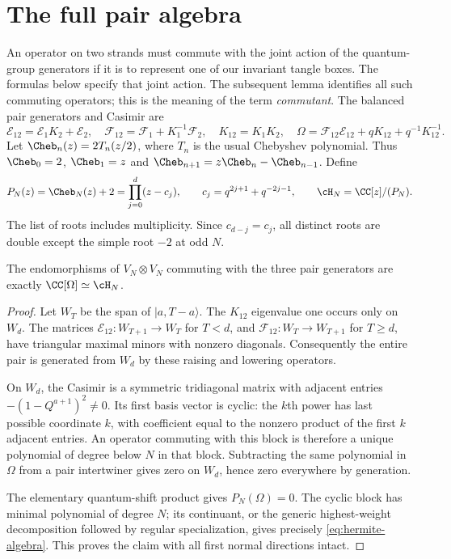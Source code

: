 \section{The full pair algebra}

An operator on two strands must commute with the joint action of the quantum-group generators if it is to represent one of our invariant tangle boxes. The formulas below specify that joint action. The subsequent lemma identifies all such commuting operators; this is the meaning of the term \emph{commutant}.
The balanced pair generators and Casimir are
\begin{equation}\label{eq:pair-casimir}
 \mathcal E_{12}=\mathcal E_1K_2+\mathcal E_2,\quad
 \mathcal F_{12}=\mathcal F_1+K_1^{-1}\mathcal F_2,\quad
 K_{12}=K_1K_2,\quad
 \Omega=\mathcal F_{12}\mathcal E_{12}+qK_{12}+q^{-1}K_{12}^{-1}.
\end{equation}
Let $\Cheb_n(z)=2T_n(z/2)$, where $T_n$ is the usual Chebyshev polynomial. Thus $\Cheb_0=2$, $\Cheb_1=z$ and $\Cheb_{n+1}=z\Cheb_n-\Cheb_{n-1}$. Define
\begin{equation}\label{eq:hermite-algebra}
 P_N(z)=\Cheb_N(z)+2=\prod_{j=0}^{d}(z-c_j),\qquad
 c_j=q^{2j+1}+q^{-2j-1},\qquad
 \cH_N=\CC[z]/(P_N).
\end{equation}
The list of roots includes multiplicity. Since $c_{d-j}=c_j$, all distinct roots are double except the simple root $-2$ at odd $N$.

\begin{lemma}\label{lem:commutant}
The endomorphisms of $V_N\otimes V_N$ commuting with the three pair generators are exactly $\CC[\Omega]\simeq\cH_N$.
\end{lemma}
\begin{proof}
Let $W_T$ be the span of $|a,T-a\rangle$. The $K_{12}$ eigenvalue one occurs only on $W_d$. The matrices $\mathcal E_{12}:W_{T+1}\to W_T$ for $T<d$, and $\mathcal F_{12}:W_T\to W_{T+1}$ for $T\ge d$, have triangular maximal minors with nonzero diagonals. Consequently the entire pair is generated from $W_d$ by these raising and lowering operators.

On $W_d$, the Casimir is a symmetric tridiagonal matrix with adjacent entries $-(1-Q^{a+1})^2\ne0$. Its first basis vector is cyclic: the $k$th power has last possible coordinate $k$, with coefficient equal to the nonzero product of the first $k$ adjacent entries. An operator commuting with this block is therefore a unique polynomial of degree below $N$ in that block. Subtracting the same polynomial in $\Omega$ from a pair intertwiner gives zero on $W_d$, hence zero everywhere by generation.

The elementary quantum-shift product gives $P_N(\Omega)=0$. The cyclic block has minimal polynomial of degree $N$; its continuant, or the generic highest-weight decomposition followed by regular specialization, gives precisely \eqref{eq:hermite-algebra}. This proves the claim with all first normal directions intact.
\end{proof}

